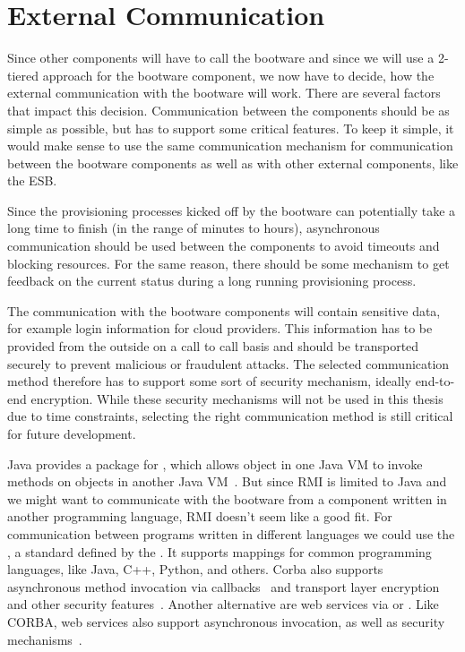 \section{External Communication}
\label{design:communication}

Since other components will have to call the bootware and since we will use a 2-tiered approach for the bootware component, we now have to decide, how the external communication with the bootware will work.
There are several factors that impact this decision.
Communication between the components should be as simple as possible, but has to support some critical features.
To keep it simple, it would make sense to use the same communication mechanism for communication between the bootware components as well as with other external components, like the ESB.

Since the provisioning processes kicked off by the bootware can potentially take a long time to finish (in the range of minutes to hours), asynchronous communication should be used between the components to avoid timeouts and blocking resources.
For the same reason, there should be some mechanism to get feedback on the current status during a long running provisioning process.

The communication with the bootware components will contain sensitive data, for example login information for cloud providers.
This information has to be provided from the outside on a call to call basis and should be transported securely to prevent malicious or fraudulent attacks.
The selected communication method therefore has to support some sort of security mechanism, ideally end-to-end encryption.
While these security mechanisms will not be used in this thesis due to time constraints, selecting the right communication method is still critical for future development.

Java provides a package for , which allows object in one Java VM to invoke methods on objects in another Java VM~\autocite{rmi}.
But since RMI is limited to Java and we might want to communicate with the bootware from a component written in another programming language, RMI doesn't seem like a good fit.
For communication between programs written in different languages we could use the , a standard defined by the .
It supports mappings for common programming languages, like Java, C++, Python, and others.
Corba also supports asynchronous method invocation via callbacks~\autocite{corba:async} and transport layer encryption and other security features~\autocite{corba:security}.
Another alternative are web services via  or .
Like CORBA, web services also support asynchronous invocation, as well as security mechanisms~\autocite{ws:security}.

